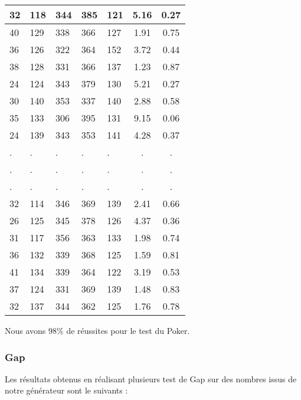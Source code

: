 \documentclass[12pt,a4paper]{article}
\begin{document}
\begin{center}
\begin{tabular}{|l|l|l|l|l|c|c|}
32 & 118 & 344 & 385 & 121 &  5.16 &  0.27\\ \hline
40 & 129 & 338 & 366 & 127 &  1.91 &  0.75\\ \hline
36 & 126 & 322 & 364 & 152 &  3.72 &  0.44\\ \hline
38 & 128 & 331 & 366 & 137 &  1.23 &  0.87\\ \hline
24 & 124 & 343 & 379 & 130 &  5.21 &  0.27\\ \hline
30 & 140 & 353 & 337 & 140 &  2.88 &  0.58\\ \hline
35 & 133 & 306 & 395 & 131 &  9.15 &  0.06\\ \hline
24 & 139 & 343 & 353 & 141 &  4.28 &  0.37\\ \hline
 . & . & . & . & . & . & . \\ \hline
 . & . & . & . & . & . & . \\ \hline
 . & . & . & . & . & . & . \\ \hline
32 & 114 & 346 & 369 & 139 &  2.41 &  0.66\\ \hline
26 & 125 & 345 & 378 & 126 &  4.37 &  0.36\\ \hline
31 & 117 & 356 & 363 & 133 &  1.98 &  0.74\\ \hline
36 & 132 & 339 & 368 & 125 &  1.59 &  0.81\\ \hline
41 & 134 & 339 & 364 & 122 &  3.19 &  0.53\\ \hline
37 & 124 & 331 & 369 & 139 &  1.48 &  0.83\\ \hline
32 & 137 & 344 & 362 & 125 &  1.76 &  0.78\\ \hline
\end{tabular}
\end{center}
Nous avons $98\%$ de réussites pour le test du Poker.

\subsubsection{Gap}

Les résultats obtenus en réalisant plusieurs test de Gap sur des nombres issus de notre générateur sont le suivants :
\end{document}
